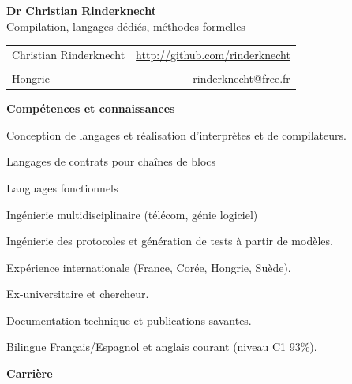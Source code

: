 \documentclass[a4paper,11pt]{article}
\begin{document}
\begin{center}
\textbf{\LARGE Dr Christian Rinderknecht}\\[5mm]
{\large Compilation, langages dédiés, méthodes formelles}
\end{center}

\noindent
\begin{tabular}{@{}l@{\qquad\qquad\qquad\qquad}r@{}}
  Christian Rinderknecht
& \url{http://github.com/rinderknecht}\\
  \phantom{\ }
& \texttt{\phantom{+XX XX XXX XXXX}}\\
  Hongrie
& \url{rinderknecht@free.fr}
\end{tabular}

\medskip


\pagestyle{empty}

\bigskip
\noindent\textbf{\large Compétences et connaissances}
\begin{itemize*}

  \item Conception de langages et réalisation d'interprètes et de
    compilateurs.

  \item Langages de contrats pour chaînes de blocs

  \item Languages fonctionnels

  \item Ingénierie multidisciplinaire (télécom, génie logiciel)

  \item Ingénierie des protocoles et génération de tests à partir de
    modèles.

  \item Expérience internationale (France, Corée, Hongrie, Suède).

  \item Ex-universitaire et chercheur.

  \item Documentation technique et publications savantes.

  \item Bilingue Français/Espagnol et anglais courant (niveau C1 93\%).

\end{itemize*}

\bigskip

\noindent\textbf{\large Carrière}
\bigskip
\end{document}
